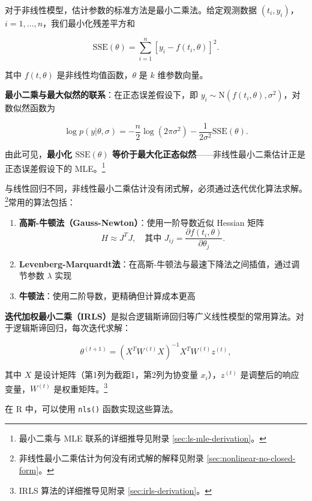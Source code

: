对于非线性模型，估计参数的标准方法是最小二乘法。给定观测数据 $(t_i, y_i)$，$i = 1, \ldots, n$，我们最小化残差平方和

\begin{equation}
\mathrm{SSE}(\theta) = \sum_{i=1}^{n} [y_i - f(t_i, \theta)]^2. \label{eq:nonlinear-sse}
\end{equation}

其中 $f(t, \theta)$ 是非线性均值函数，$\theta$ 是 $k$ 维参数向量。

\textbf{最小二乘与最大似然的联系}：在正态误差假设下，即 $y_i \sim \mathrm{N}(f(t_i, \theta), \sigma^2)$，对数似然函数为

\[
\log p(y | \theta, \sigma) = -\frac{n}{2}\log(2\pi\sigma^2) - \frac{1}{2\sigma^2}\mathrm{SSE}(\theta).
\]

由此可见，\textbf{最小化 $\mathrm{SSE}(\theta)$ 等价于最大化正态似然}——非线性最小二乘估计正是正态误差假设下的 MLE。\footnote{最小二乘与 MLE 联系的详细推导见附录 \cref{sec:ls-mle-derivation}。}

与线性回归不同，非线性最小二乘估计没有闭式解，必须通过迭代优化算法求解。\footnote{非线性最小二乘估计为何没有闭式解的解释见附录 \cref{sec:nonlinear-no-closed-form}。}常用的算法包括：

\begin{enumerate}
  \item \textbf{高斯-牛顿法（Gauss-Newton）}：使用一阶导数近似 Hessian 矩阵
    \[
    H \approx J^T J, \quad \text{其中 } J_{ij} = \frac{\partial f(t_i, \theta)}{\partial \theta_j}. \label{eq:gauss-newton}
    \]
  \item \textbf{Levenberg-Marquardt法}：在高斯-牛顿法与最速下降法之间插值，通过调节参数 $\lambda$ 实现
  \item \textbf{牛顿法}：使用二阶导数，更精确但计算成本更高
\end{enumerate}

\textbf{迭代加权最小二乘（IRLS）}是拟合逻辑斯谛回归等广义线性模型的常用算法。对于逻辑斯谛回归，每次迭代求解：

\begin{equation}
\theta^{(t+1)} = (X^T W^{(t)} X)^{-1} X^T W^{(t)} z^{(t)}, \label{eq:irls-logistic}
\end{equation}

其中 $X$ 是设计矩阵（第1列为截距1，第2列为协变量 $x_i$），$z^{(t)}$ 是调整后的响应变量，$W^{(t)}$ 是权重矩阵。\footnote{IRLS 算法的详细推导见附录 \cref{sec:irls-derivation}。}

在 R 中，可以使用 \texttt{nls()} 函数实现这些算法。

